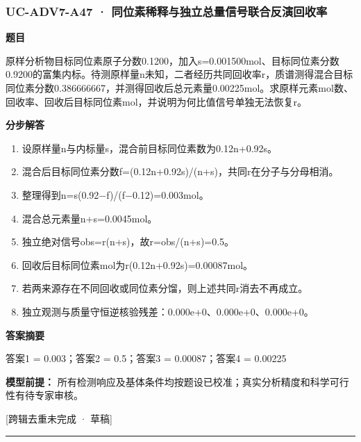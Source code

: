 \documentclass[UTF8,11pt,a4paper]{ctexart}
\begin{document}
\subsubsection*{UC-ADV7-A47 · 同位素稀释与独立总量信号联合反演回收率}
\noindent\textbf{题目}\par
原样分析物目标同位素原子分数0.1200，加入s=0.001500mol、目标同位素分数0.9200的富集内标。待测原样量n未知，二者经历共同回收率r，质谱测得混合目标同位素分数0.386666667，并测得回收后总元素量0.00225mol。求原样元素mol数、回收率、回收后目标同位素mol，并说明为何比值信号单独无法恢复r。\par
\medskip\noindent\textbf{分步解答}
\begin{enumerate}
\item 设原样量n与内标量s，混合前目标同位素数为0.12n+0.92s。
\item 混合后目标同位素分数f=(0.12n+0.92s)/(n+s)，共同r在分子与分母相消。
\item 整理得到n=s(0.92−f)/(f−0.12)=0.003mol。
\item 混合总元素量n+s=0.0045mol。
\item 独立绝对信号obs=r(n+s)，故r=obs/(n+s)=0.5。
\item 回收后目标同位素mol为r(0.12n+0.92s)=0.00087mol。
\item 若两来源存在不同回收或同位素分馏，则上述共同r消去不再成立。
\item 独立观测与质量守恒逆核验残差：0.000e+0、0.000e+0、0.000e+0。
\end{enumerate}
\noindent\textbf{答案摘要}\par
答案1 = 0.003；答案2 = 0.5；答案3 = 0.00087；答案4 = 0.00225\par
\noindent\textbf{模型前提：}
所有检测响应及基体条件均按题设已校准；真实分析精度和科学可行性有待专家审核。\par
\noindent\textcolor{red!65!black}{[跨辑去重未完成 · 草稿]} \par
\medskip\hrule\medskip
{}
\end{document}
